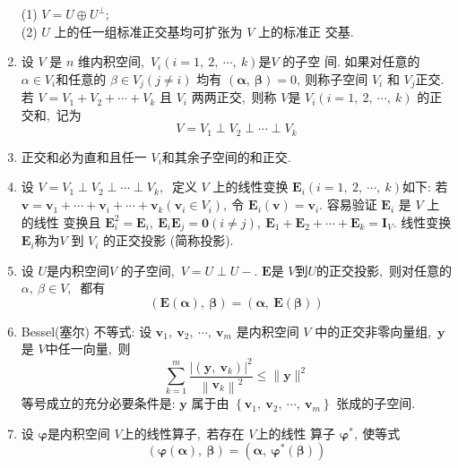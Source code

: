 \begin{enumerate}
		(1) $ V=U \oplus U^{\perp} ;$\\
		(2)  $U$  上的任一组标准正交基均可扩张为  $V$  上的标准正 交基.
		\item 设  $V $ 是 $ n $ 维内积空间,\   $V_{i}(i=1,\ 2,\  \cdots,\  k)  $是$  V $ 的子空 间. 如果对任意的$  \alpha \in V_{i}  $和任意的  $\beta \in V_{j}(j \neq i) $ 均有  $(\boldsymbol{\alpha},\  \boldsymbol{\beta})=0 ,\  $则称子空间  $V_{i} $ 和  $V_{j}  $正交. 若 $ V=V_{1}+V_{2}+\cdots+V_{k} $ 且  $V_{i}$  两两正交,\  则称 $ V  $是  $V_{i}(i=1,\ 2,\  \cdots,\  k)$ 的正交和,\  记为
		$$V=V_{1} \perp V_{2} \perp \cdots \perp V_{k}$$
		\item 正交和必为直和且任一 $ V_{i}  $和其余子空间的和正交.
		\item 设  $V=V_{1} \perp V_{2} \perp \cdots \perp V_{k} ,\ $ 定义 $ V$  上的线性变换 $ \boldsymbol{E}_{i}(i=1,\ 2,\  \cdots,\  k)  $如下: 若  $\boldsymbol{v}=\boldsymbol{v}_{1}+\cdots+\boldsymbol{v}_{i}+\cdots+   \boldsymbol{v}_{k}\left(\boldsymbol{v}_{i} \in V_{i}\right) ,\  $令 $ \boldsymbol{E}_{i}(\boldsymbol{v})=\boldsymbol{v}_{i} .$ 容易验证  $\boldsymbol{E}_{i}$  是 $ V $ 上的线性 变换且  $\boldsymbol{E}_{i}^{2}=\boldsymbol{E}_{i},\  \boldsymbol{E}_{i} \boldsymbol{E}_{j}=\mathbf{0}(i \neq j),\  \boldsymbol{E}_{1}+\boldsymbol{E}_{2}+\cdots+\boldsymbol{E}_{k}=   \boldsymbol{I}_{V} .$ 线性变换$  \boldsymbol{E}_{i}  $称为$  V $ 到  $V_{i} $ 的正交投影 (简称投影).
		\item 设 $ U  $是内积空间$  V $ 的子空间,\   $V=U \perp U-.$ $\boldsymbol{E}  $是 $ V  $到$  U  $的正交投影,\  则对任意的 $ \alpha,\  \beta \in V ,\ $ 都有
		$$(\boldsymbol{E}(\boldsymbol{\alpha}),\  \boldsymbol{\beta})=(\boldsymbol{\alpha},\  \boldsymbol{E}(\boldsymbol{\beta}))$$
		\item Bessel(塞尔) 不等式: 设  $\boldsymbol{v}_{1},\  \boldsymbol{v}_{2},\  \cdots,\  \boldsymbol{v}_{m}$ 是内积空间  $V $ 中的正交非零向量组,\   $\boldsymbol{y} $ 是 $ V  $中任一向量,\  则
		$$\sum_{k=1}^{m} \frac{\left|\left(\boldsymbol{y},\  \boldsymbol{v}_{k}\right)\right|^{2}}{\left\|\boldsymbol{v}_{k}\right\|^{2}} \leqslant\|\boldsymbol{y}\|^{2}$$
		等号成立的充分必要条件是: $ \boldsymbol{y}$  属于由  $\left\{\boldsymbol{v}_{1},\  \boldsymbol{v}_{2},\  \cdots,\  \boldsymbol{v}_{m}\right\} $ 张成的子空间.
		\item 设  $\boldsymbol{\varphi} $是内积空间  $V  $上的线性算子,\  若存在  $V  $上的线性 算子 $ \boldsymbol{\varphi}^{*} ,\  $使等式
		$$(\boldsymbol{\varphi}(\boldsymbol{\alpha}),\  \boldsymbol{\beta})=\left(\boldsymbol{\alpha},\  \boldsymbol{\varphi}^{*}(\boldsymbol{\beta})\right)$$

\end{enumerate}

